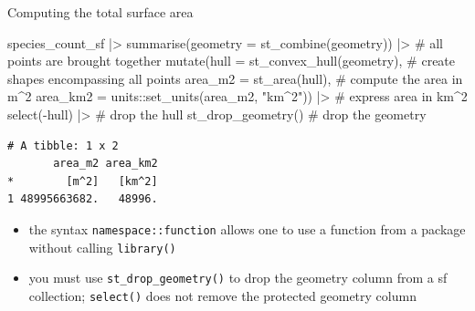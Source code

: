 \documentclass[
  ignorenonframetext,
  aspectratio=169,
]{beamer}
\newenvironment{Shaded}{\begin{snugshade}}{\end{snugshade}}
\newcommand{\AttributeTok}[1]{\textcolor[rgb]{0.40,0.45,0.13}{#1}}
\newcommand{\CommentTok}[1]{\textcolor[rgb]{0.37,0.37,0.37}{#1}}
\newcommand{\FunctionTok}[1]{\textcolor[rgb]{0.28,0.35,0.67}{#1}}
\newcommand{\NormalTok}[1]{\textcolor[rgb]{0.00,0.23,0.31}{#1}}
\newcommand{\SpecialCharTok}[1]{\textcolor[rgb]{0.37,0.37,0.37}{#1}}
\newcommand{\StringTok}[1]{\textcolor[rgb]{0.13,0.47,0.30}{#1}}
\providecommand{\tightlist}{%
  \setlength{\itemsep}{0pt}\setlength{\parskip}{0pt}}
\let\oldtexttt\texttt
\renewcommand{\texttt}[1]{\colorbox{gray!20}{\oldtexttt{#1}}}
\begin{document}
\begin{frame}[fragile]{Computing the total surface area}
\protect{}\label{computing-the-total-surface-area}
\scriptsize

\begin{Shaded}
\begin{Highlighting}[]
\NormalTok{species\_count\_sf }\SpecialCharTok{|\textgreater{}} 
    \FunctionTok{summarise}\NormalTok{(}\AttributeTok{geometry =} \FunctionTok{st\_combine}\NormalTok{(geometry)) }\SpecialCharTok{|\textgreater{}} \CommentTok{\# all points are brought together}
    \FunctionTok{mutate}\NormalTok{(}\AttributeTok{hull =} \FunctionTok{st\_convex\_hull}\NormalTok{(geometry), }\CommentTok{\# create shapes encompassing all points}
           \AttributeTok{area\_m2 =} \FunctionTok{st\_area}\NormalTok{(hull), }\CommentTok{\# compute the area in m\^{}2}
           \AttributeTok{area\_km2 =}\NormalTok{ units}\SpecialCharTok{::}\FunctionTok{set\_units}\NormalTok{(area\_m2, }\StringTok{"km\^{}2"}\NormalTok{)) }\SpecialCharTok{|\textgreater{}} \CommentTok{\# express area in km\^{}2}
    \FunctionTok{select}\NormalTok{(}\SpecialCharTok{{-}}\NormalTok{hull) }\SpecialCharTok{|\textgreater{}} \CommentTok{\# drop the hull}
    \FunctionTok{st\_drop\_geometry}\NormalTok{() }\CommentTok{\# drop the geometry}
\end{Highlighting}
\end{Shaded}

\begin{verbatim}
# A tibble: 1 x 2
       area_m2 area_km2
*        [m^2]   [km^2]
1 48995663682.   48996.
\end{verbatim}

\normalsize

\pause

\begin{itemize}
\tightlist
\item
  the syntax \texttt{namespace::function} allows one to use a function
  from a package without calling \texttt{library()}
\item
  you must use \texttt{st\_drop\_geometry()} to drop the geometry column
  from a sf collection; \texttt{select()} does not remove the protected
  geometry column
\end{itemize}
\end{frame}
\end{document}
